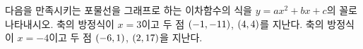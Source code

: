 다음을 만족시키는 포물선을 그래프로 하는 이차함수의 식을 $y=ax^2+bx+c$의 꼴로 나타내시오.
 축의 방정식이 $x=3$이고 두 점 $(-1{,}\mkern3mu\mathopen{}-11)$, $(4{,}\mkern3mu\mathopen{}4)$를 지난다.
 축의 방정식이 $x=-4$이고 두 점 $(-6{,}\mkern3mu\mathopen{}1)$, $(2{,}\mkern3mu\mathopen{}17)$을 지난다.
